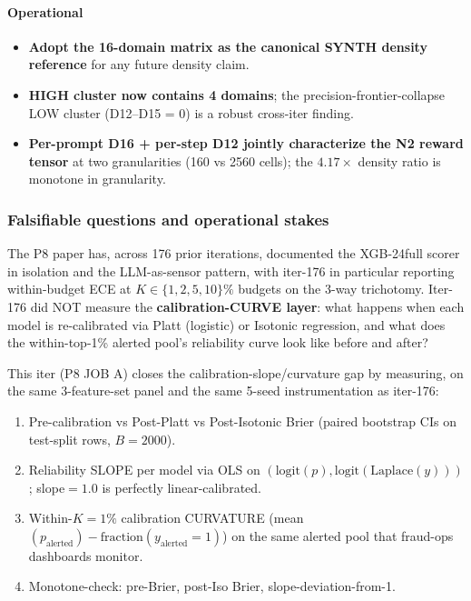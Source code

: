 \documentclass{article}
\begin{document}
\paragraph{Operational}
\begin{itemize}
\item \textbf{Adopt the 16-domain matrix as the canonical SYNTH density reference} for any future density claim.
\item \textbf{HIGH cluster now contains 4 domains}; the precision-frontier-collapse LOW cluster (D12--D15 = 0) is a robust cross-iter finding.
\item \textbf{Per-prompt D16 + per-step D12 jointly characterize the N2 reward tensor} at two granularities (160 vs 2560 cells); the $4.17\times$ density ratio is monotone in granularity.
\end{itemize} 

\subsubsection{Falsifiable questions and operational stakes}\label{sec:p8-iter180-calib}
The P8 paper has, across 176 prior iterations, documented the XGB-24full
scorer in isolation and the LLM-as-sensor pattern, with iter-176 in
particular reporting within-budget ECE at $K\in\{1,2,5,10\}\%$ budgets
on the 3-way trichotomy. Iter-176 did NOT measure the
\textbf{calibration-CURVE layer}: what happens when each model is
re-calibrated via Platt (logistic) or Isotonic regression, and what
does the within-top-1\% alerted pool's reliability curve look like
before and after?

This iter (P8 JOB A) closes the calibration-slope/curvature gap by
measuring, on the same 3-feature-set panel and the same 5-seed
instrumentation as iter-176:
\begin{enumerate}
\item Pre-calibration vs Post-Platt vs Post-Isotonic Brier
  (paired bootstrap CIs on test-split rows, $B{=}2000$).
\item Reliability SLOPE per model via OLS on
  $(\mathrm{logit}(p), \mathrm{logit}(\mathrm{Laplace}(y)))$;
  slope${=}1.0$ is perfectly linear-calibrated.
\item Within-$K{=}1\%$ calibration CURVATURE
  (mean$(p_{\mathrm{alerted}}) - \mathrm{fraction}(y_{\mathrm{alerted}}{=}1)$)
  on the same alerted pool that fraud-ops dashboards monitor.
\item Monotone-check: pre-Brier, post-Iso Brier, slope-deviation-from-1.
\end{enumerate}
\end{document}
